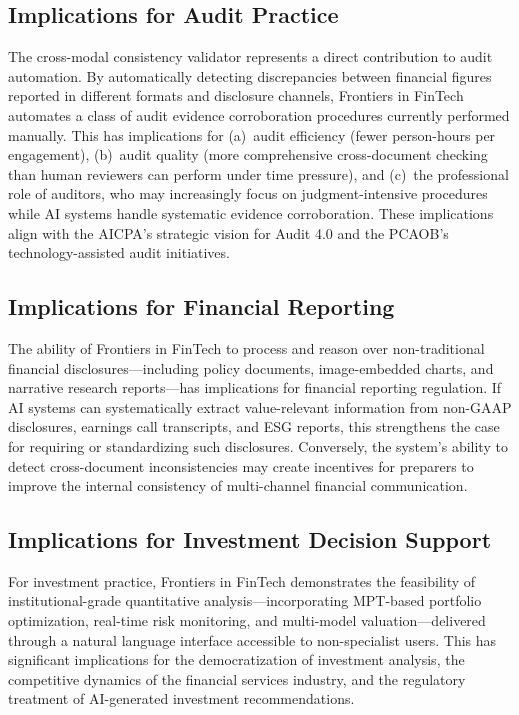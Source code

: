 \documentclass[12pt,letterpaper]{article}
\begin{document}
\subsection{Implications for Audit Practice}

The cross-modal consistency validator represents a direct contribution
to audit automation.
By automatically detecting discrepancies between financial figures
reported in different formats and disclosure channels, Frontiers in FinTech
automates a class of audit evidence corroboration procedures currently
performed manually.
This has implications for (a)~audit efficiency (fewer person-hours per
engagement), (b)~audit quality (more comprehensive cross-document
checking than human reviewers can perform under time pressure), and
(c)~the professional role of auditors, who may increasingly focus on
judgment-intensive procedures while AI systems handle systematic
evidence corroboration.
These implications align with the AICPA's strategic vision for
Audit 4.0 and the PCAOB's technology-assisted audit initiatives.

\subsection{Implications for Financial Reporting}

The ability of Frontiers in FinTech to process and reason over non-traditional
financial disclosures---including policy documents, image-embedded
charts, and narrative research reports---has implications for
financial reporting regulation.
If AI systems can systematically extract value-relevant information
from non-GAAP disclosures, earnings call transcripts, and ESG reports,
this strengthens the case for requiring or standardizing such
disclosures.
Conversely, the system's ability to detect cross-document
inconsistencies may create incentives for preparers to improve the
internal consistency of multi-channel financial communication.

\subsection{Implications for Investment Decision Support}

For investment practice, Frontiers in FinTech demonstrates the feasibility of
institutional-grade quantitative analysis---incorporating MPT-based
portfolio optimization, real-time risk monitoring, and multi-model
valuation---delivered through a natural language interface accessible
to non-specialist users.
This has significant implications for the democratization of investment
analysis, the competitive dynamics of the financial services industry,
and the regulatory treatment of AI-generated investment recommendations.
\end{document}
